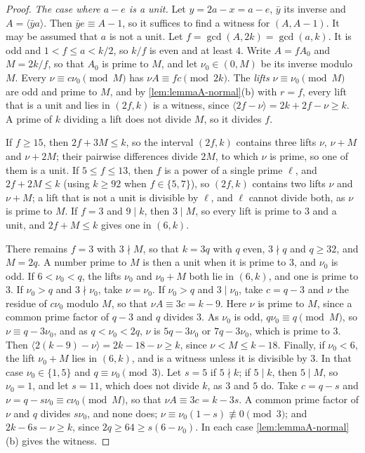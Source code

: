 \begin{proof}
\emph{The case where $a-e$ is a unit.} Let $y=2a-x=a-e$, $\bar y$ its inverse
and $A=\langle\bar ya\rangle$. Then $\bar ye\equiv A-1$, so it suffices to find
a witness for $(A,A-1)$. It may be assumed that $a$ is not a unit. Let
$f=\gcd(A,2k)=\gcd(a,k)$. It is odd and $1<f\le a<k/2$, so $k/f$ is even and
at least $4$. Write $A=fA_0$ and $M=2k/f$, so that $A_0$ is prime to $M$, and let
$\nu_0\in(0,M)$ be its inverse modulo $M$. Every $\nu\equiv c\nu_0\pmod M$ has
$\nu A\equiv fc\pmod{2k}$. The \emph{lifts} $\nu\equiv\nu_0\pmod M$ are odd and
prime to $M$, and by \autoref{lem:lemmaA-normal}(b) with $r=f$, every lift
that is a unit and lies in $(2f,k)$ is a witness, since
$\langle2f-\nu\rangle=2k+2f-\nu\ge k$. A prime of $k$ dividing a lift does not
divide $M$, so it divides $f$.

If $f\ge15$, then $2f+3M\le k$, so the interval $(2f,k)$ contains three
lifts $\nu$, $\nu+M$ and $\nu+2M$; their pairwise differences divide $2M$, to
which $\nu$ is prime, so one of them is a unit. If $5\le f\le13$, then $f$ is
a power of a single prime $\ell$, and $2f+2M\le k$ (using $k\ge92$ when
$f\in\{5,7\}$), so $(2f,k)$ contains two lifts $\nu$ and $\nu+M$; a lift that
is not a unit is divisible by $\ell$, and $\ell$ cannot divide both, as $\nu$
is prime to $M$. If $f=3$ and $9\mid k$, then $3\mid M$, so every lift is prime
to $3$ and a unit, and $2f+M\le k$ gives one in $(6,k)$.

There remains $f=3$ with $3\nmid M$, so that $k=3q$ with $q$ even, $3\nmid q$
and $q\ge32$, and $M=2q$. A number prime to $M$ is then a unit when it is
prime to $3$, and $\nu_0$ is odd. If $6<\nu_0<q$, the lifts $\nu_0$ and
$\nu_0+M$ both lie in $(6,k)$, and one is prime to $3$. If $\nu_0>q$ and
$3\nmid\nu_0$, take $\nu=\nu_0$. If $\nu_0>q$ and $3\mid\nu_0$, take $c=q-3$
and $\nu$ the residue of $c\nu_0$ modulo $M$, so that $\nu A\equiv3c=k-9$.
Here $\nu$ is prime to $M$, since a common prime factor of $q-3$ and $q$
divides $3$. As $\nu_0$ is odd, $q\nu_0\equiv q\pmod M$, so
$\nu\equiv q-3\nu_0$, and as $q<\nu_0<2q$, $\nu$ is $5q-3\nu_0$ or
$7q-3\nu_0$, which is prime to $3$. Then
$\langle2(k-9)-\nu\rangle=2k-18-\nu\ge k$, since $\nu<M\le k-18$. Finally, if
$\nu_0<6$, the lift $\nu_0+M$ lies in $(6,k)$, and is a witness unless it is
divisible by $3$. In that case $\nu_0\in\{1,5\}$ and $q\equiv\nu_0\pmod3$. Let $s=5$ if $5\nmid k$; if
$5\mid k$, then $5\mid M$, so $\nu_0=1$, and let $s=11$, which does not divide
$k$, as $3$ and $5$ do. Take $c=q-s$ and $\nu=q-s\nu_0\equiv c\nu_0\pmod M$,
so that $\nu A\equiv3c=k-3s$. A common prime factor of $\nu$ and $q$ divides
$s\nu_0$, and none does; $\nu\equiv\nu_0(1-s)\not\equiv0\pmod3$; and
$2k-6s-\nu\ge k$, since $2q\ge64\ge s(6-\nu_0)$. In each case
\autoref{lem:lemmaA-normal}(b) gives the witness.


\end{proof}
